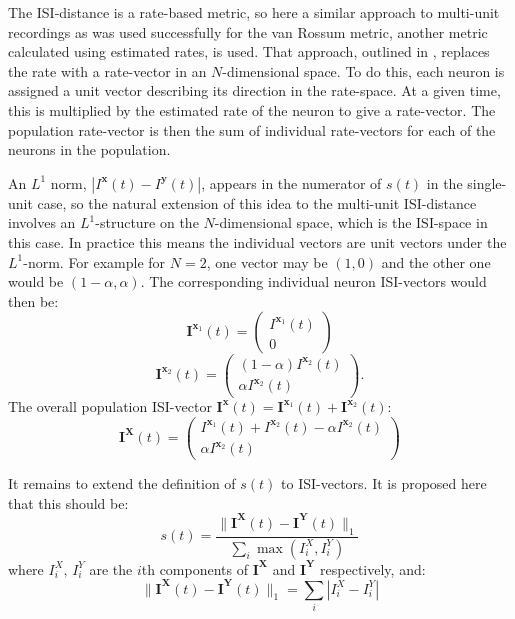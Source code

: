 The ISI-distance is a rate-based metric, so here a similar approach to multi-unit recordings as was used successfully for the van Rossum metric, another metric calculated using estimated rates, is used.  That approach, outlined in \citep{HoughtonSen2008a}, replaces the rate with a rate-vector in an $N$-dimensional space.  To do this, each neuron is assigned a unit vector describing its direction in the rate-space.  At a given time, this is multiplied by the estimated rate of the neuron to give a rate-vector. The population rate-vector is then the sum of individual rate-vectors for each of the neurons in the population.  

An $L^1$ norm, $| I^{\mathbf{x}}(t) - I^{\mathbf{y}}(t) | $, appears in the numerator of $s(t)$ in the single-unit case, so the natural extension of this idea to the multi-unit ISI-distance involves an $L^1$-structure on the $N$-dimensional space, which is the ISI-space in this case. In practice this means the individual vectors are unit vectors under the $L^1$-norm. For example for $N=2$, one vector may be $(1,0)$ and the other one would be $(1-\alpha,\alpha)$.  The corresponding individual neuron ISI-vectors would then be: 
\begin{equation}
\mathbf{I}^{\mathbf{x}_1}(t)=\begin{pmatrix}I^{\mathbf{x}_1}(t)\\0\end{pmatrix}
\end{equation}
\begin{equation}
\mathbf{I}^{\mathbf{x}_2}(t) = \begin{pmatrix} (1-\alpha)I^{\mathbf{x}_2}(t)\\ \alpha I^{\mathbf{x}_2}(t)\end{pmatrix}.
\end{equation}
The overall population ISI-vector $\mathbf{I^x}(t) = \mathbf{I}^{\mathbf{x}_1}(t) + \mathbf{I}^{\mathbf{x}_2}(t)$:
\begin{equation}
\mathbf{I^X}(t) = \begin{pmatrix} I^{\mathbf{x}_1}(t) + I^{\mathbf{x}_2}(t) - \alpha I^{\mathbf{x}_2}(t) \\ \alpha I^{\mathbf{x}_2}(t) \end{pmatrix}
\end{equation}

It remains to extend the definition of $s(t)$ to ISI-vectors. It is proposed here that this should be:
\begin{equation}
s(t) = \frac{ \| \mathbf{I^X}(t) - \mathbf{I^Y}(t) \|_1 }{ \sum_i \max ( I^X_i, I^Y_i ) }
\end{equation}
where $I^X_i, \, I^Y_i$ are the $i$th components of $\mathbf{I^X}$ and $\mathbf{I^Y}$ respectively, and:
\begin{equation}
\| \mathbf{I^X}(t) - \mathbf{I^Y}(t) \|_1 = \sum_i | I^X_i - I^Y_i |
\end{equation}

